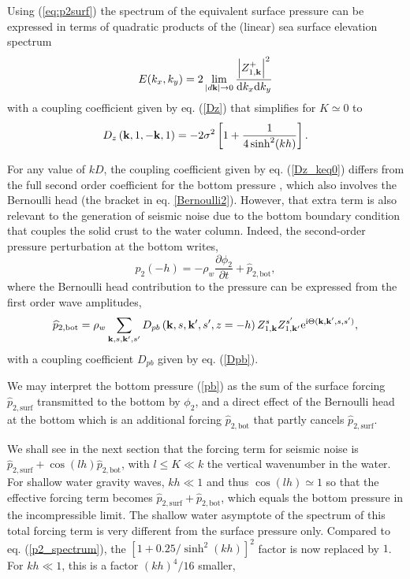 Using (\ref{eq:p2surf}) the spectrum of the equivalent surface pressure can be expressed in terms of quadratic products of the (linear) sea surface elevation spectrum   
\begin{equation}
E(k_x,k_y)  = 2 \lim_{\left|d \mathbf{k} \right| \rightarrow 0 } \frac{\left|Z_{1,\mathbf{k}}^{+}\right|^2}{\mathrm{d}k_x \mathrm{d}k_y}
\end{equation}
with a coupling coefficient given by eq. (\ref{Dz}) that simplifies for $K \simeq 0$ to   
\begin{equation}
   D_z\left(\mathbf{k},1,-\mathbf{k},1\right)   =  - 2 \sigma^2\left[1 + \frac{1}{4 \sinh^2(kh)}\right]. \label{Dz_keq0}
\end{equation}

For any value of $kD$, 
the coupling coefficient given by eq. (\ref{Dz_keq0}) differs from the full second order coefficient for the bottom pressure
\citep[e.g. eq. 4 in][]{Herbers&Guza1991}, 
which also involves the Bernoulli head (the bracket in eq. \ref{Bernoulli2}). However, that extra term 
is also relevant to the generation of seismic noise due to the  
bottom boundary condition that couples the solid crust to the water column. Indeed, the second-order 
pressure perturbation at the bottom writes, 
\begin{equation}
p_2(-h)=- \rho_w \frac{\partial \phi_2}{\partial t} + \widehat{p}_{2,\mathrm{bot}}, \label{pb}
\end{equation}
where the Bernoulli head contribution to the pressure can be expressed from the first order wave amplitudes, 
\begin{equation}
\widehat{p}_{2,\mathrm{bot}}= \rho_w \sum_{\mathbf{k},s,\mathbf{k^{\prime}},s'}  D_{pb} \left(\mathbf{k},s,\mathbf{k^{\prime}},s',z=-h\right) Z_{1,\mathbf{k}}^{s} Z_{1,\mathbf{k^{\prime}}}^{s'} 
 \mathrm{e}^{\mathrm{i}
     \Theta(\mathbf{k},\mathbf{k^{\prime}},s,s')}\label{P2bot},
\end{equation}
with a coupling coefficient $D_{pb}$ given by eq. (\ref{Dpb}).

We may interpret the bottom pressure (\ref{pb}) as the sum of the surface forcing $\widehat{p}_{2,\mathrm{surf}}$ transmitted 
to the bottom by  $\phi_2$, and  a direct effect of the Bernoulli head at the bottom which 
is an additional forcing $\widehat{p}_{2,\mathrm{bot}}$ that partly cancels $\widehat{p}_{2,\mathrm{surf}}$. 

We shall see in the next section that the forcing term for seismic noise 
is $\widehat{p}_{2,\mathrm{surf}} +\cos(lh) \widehat{p}_{2,\mathrm{bot}}$, with $l \leq K \ll k$ 
the vertical wavenumber in the water.  For shallow water gravity waves, $kh \ll 1$ and thus $\cos(lh) \simeq 1$ so that 
the effective forcing term becomes $\widehat{p}_{2,\mathrm{surf}} + \widehat{p}_{2,\mathrm{bot}}$, 
which equals the bottom pressure in the  incompressible limit. 
The shallow water asymptote of the spectrum of this total forcing term is 
very different from the surface pressure only. Compared to eq. (\ref{p2_spectrum}), 
the  $\left[1  + 0.25 / \sinh^2(kh)\right]^2$ factor is now replaced by 
$1$. For $kh \ll 1$, this is a factor $(kh)^4/16$ smaller,



